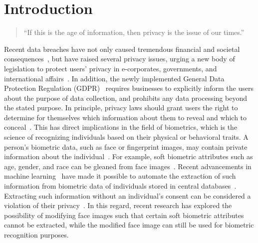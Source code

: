 \documentclass[10pt,twocolumn,letterpaper]{article}
\begin{document}
   




\section{Introduction}



\begin{quote}
``If this is the age of information, then privacy is the issue of our times.''~\cite{acquisti_privacy_2015}
\end{quote} 

Recent data breaches have not only caused tremendous financial and societal consequences~\cite{facebook_scandal_2018},
but have raised several privacy issues, urging a new body of legislation to protect users' privacy in e-corporates, governments, and international affairs~\cite{acquisti_predicting_2009}. In addition, the newly implemented General Data Protection Regulation
(GDPR)~\cite{eu_gdpr_2016} requires businesses to explicitly inform the users about the purpose of data collection, and prohibits any data processing beyond the stated purpose. 
In principle, privacy laws should grant users the right to determine for themselves which information about them to reveal and which to conceal~\cite{kindt_privacy_2016,acquisti_what_2013,acquisti_economics_2016,jourabloo_attribute_2015}. This has direct implications in the field of biometrics, which is the science of recognizing individuals based on their physical or behavioral traits.   %
A person's biometric data, such as face or fingerprint images, may contain private information about the individual~\cite{jain_introduction_2011}. For example, soft biometric attributes such as age, gender, and race can be gleaned from face images~\cite{dantcheva_what_2016}. Recent advancements in machine learning~\cite{raschka_python_2017} have made it possible to automate the extraction of such information from biometric data of individuals stored in central databases~\cite{dantcheva_what_2016}. Extracting such information without an individual's consent can be considered a violation of their privacy~\cite{kindt_privacy_2016,acquisti_what_2013,acquisti_economics_2016,mirjalili_soft_2017}. In this regard, recent research has explored the possibility of modifying face images such that certain soft biometric attributes cannot be extracted, while the modified face image can still be used for biometric recognition purposes. 
\end{document}
